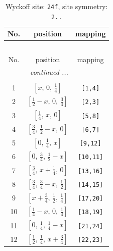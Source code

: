 \documentclass[fleqn,8pt]{jsarticle}
\begin{document}
\begin{longtable}{ccc}
\caption{Wyckoff site: {\tt 24f}, site symmetry: {\tt 2..}}
 \\
 \hline \hline
No. & position & mapping \\ \hline \endfirsthead

\multicolumn{2}{l}{\tablename\ \thetable{}} \\
 \hline \hline
No. & position & mapping \\ \hline \endhead

 \hline \hline
\multicolumn{2}{r}{\footnotesize\it continued ...} \\ \endfoot

 \hline \hline
\multicolumn{2}{r}{} \\ \endlastfoot

1 & $\left[ x,\, 0,\, \frac{1}{4} \right]$ & {\tt [1,4]} \\ \hline
2 & $\left[ \frac{1}{2} - x,\, 0,\, \frac{3}{4} \right]$ & {\tt [2,3]} \\ \hline
3 & $\left[ \frac{1}{4},\, x,\, 0 \right]$ & {\tt [5,8]} \\ \hline
4 & $\left[ \frac{3}{4},\, \frac{1}{2} - x,\, 0 \right]$ & {\tt [6,7]} \\ \hline
5 & $\left[ 0,\, \frac{1}{4},\, x \right]$ & {\tt [9,12]} \\ \hline
6 & $\left[ 0,\, \frac{3}{4},\, \frac{1}{2} - x \right]$ & {\tt [10,11]} \\ \hline
7 & $\left[ \frac{3}{4},\, x + \frac{1}{4},\, 0 \right]$ & {\tt [13,16]} \\ \hline
8 & $\left[ \frac{3}{4},\, \frac{3}{4} - x,\, \frac{1}{2} \right]$ & {\tt [14,15]} \\ \hline
9 & $\left[ x + \frac{3}{4},\, \frac{1}{2},\, \frac{1}{4} \right]$ & {\tt [17,20]} \\ \hline
10 & $\left[ \frac{1}{4} - x,\, 0,\, \frac{1}{4} \right]$ & {\tt [18,19]} \\ \hline
11 & $\left[ 0,\, \frac{1}{4},\, \frac{1}{4} - x \right]$ & {\tt [21,24]} \\ \hline
12 & $\left[ \frac{1}{2},\, \frac{1}{4},\, x + \frac{3}{4} \right]$ & {\tt [22,23]} \\
\end{longtable}
\renewcommand{\arraystretch}{1.2}
\end{document}
